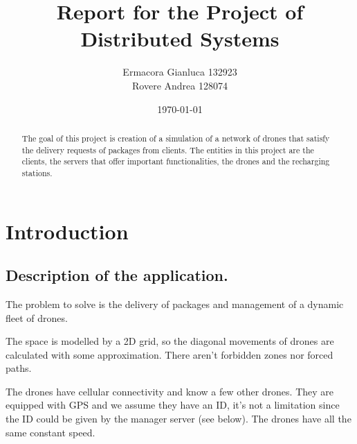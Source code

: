 \documentclass[a4paper, oneside]{memoir}
\title{Report for the Project of Distributed Systems}
\author{Ermacora Gianluca 132923\\ Rovere Andrea 128074}
\date{\today}
\begin{document}
\begin{titlingpage}
\maketitle
\begin{abstract}
The goal of this project is creation of a simulation of a network of drones that satisfy the delivery requests of packages from clients. The entities in this project are the clients, the servers that offer important functionalities, the drones and the recharging stations.
\end{abstract}
\end{titlingpage}
\tableofcontents
\chapter{Introduction}\label{ch:intro}


\section{Description of the application.}
The problem to solve is the delivery of packages and management of a dynamic fleet of drones.

The space is modelled by a 2D grid, so the diagonal movements of drones are calculated with some approximation. There aren't forbidden zones nor forced paths.

The drones have cellular connectivity and know a few other drones. They are equipped with GPS and we assume they have an ID, it's not a limitation since the ID could be given by the manager server (see below). The drones have all the same constant speed.
\end{document}
